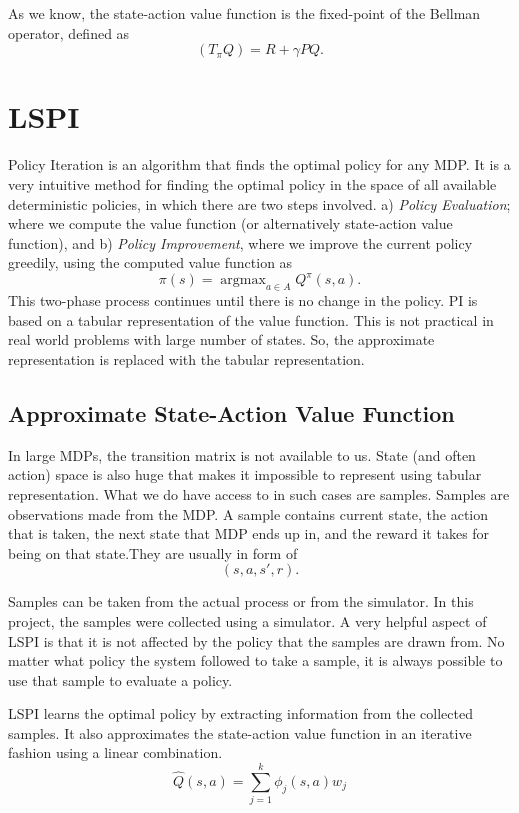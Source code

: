 \documentclass{article}
\theoremstyle{remark}
\DeclareMathOperator{\argmax}{argmax} %
\begin{document}
As we know, the state-action value function is the fixed-point of the Bellman operator, defined as
\[(T_\pi Q) = R + \gamma P Q.
\]

\section{LSPI} \label{sec:lspi}
Policy Iteration \cite{howard:dp} is an algorithm that finds the optimal policy for any MDP. It is a very intuitive method for finding the optimal policy in the space of all available deterministic policies, in which there are two steps involved. a) \textit{Policy Evaluation}; where we compute the value function (or alternatively state-action value function), and b) \textit{Policy Improvement}, where we improve the current policy greedily, using the computed value function as
\[ \pi(s) = \argmax_{a \in A} Q^\pi (s,a).
\]
This two-phase process continues until there is no change in the policy. PI is based on a tabular representation of the value function. This is not practical in real world problems with large number of states. So, the approximate representation is replaced with the tabular representation. 

\subsection{Approximate State-Action Value Function} \label{sec:approximate}
In large MDPs, the transition matrix is not available to us. State (and often action) space is also huge that makes it impossible to represent using tabular representation. What we do have access to in such cases are samples. Samples are observations made from the MDP. A sample contains current state, the action that is taken, the next state that MDP ends up in, and the reward it takes for being on that state.They are usually in form of
\[(s, a, s', r).
\]

Samples can be taken from the actual process or from the simulator. In this project, the samples were collected using a simulator. A very helpful aspect of LSPI is that it is not affected by the policy that the samples are drawn from. No matter what policy the system followed to take a sample, it is always possible to use that sample to evaluate a policy.

LSPI learns the optimal policy by extracting information from the collected samples. It also approximates the state-action value function in an iterative fashion using a linear combination.
\begin{equation} \label{eq:approx}
  \hat{Q}(s,a) = \sum_{j=1}^k \phi_j(s,a) w_j
\end{equation}
\end{document}
